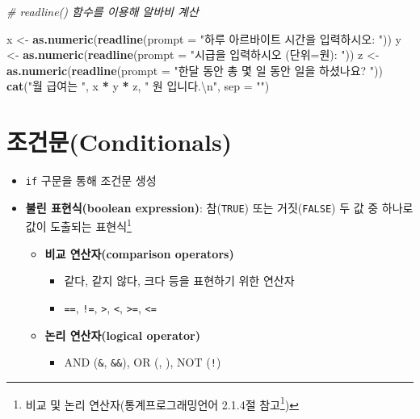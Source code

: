 \documentclass[
  11pt,
]{krantz}
\newenvironment{Shaded}{\begin{snugshade}}{\end{snugshade}}
\newcommand{\CharTok}[1]{\textcolor[rgb]{0.5,0.5,0.5}{#1}}
\newcommand{\CommentTok}[1]{\textcolor[rgb]{0.37,0.37,0.37}{\textit{#1}}}
\newcommand{\DataTypeTok}[1]{\textcolor[rgb]{0.27,0.27,0.27}{#1}}
\newcommand{\KeywordTok}[1]{\textcolor[rgb]{0.27,0.27,0.27}{\textbf{#1}}}
\newcommand{\NormalTok}[1]{#1}
\newcommand{\OperatorTok}[1]{\textcolor[rgb]{0.43,0.43,0.43}{\textbf{#1}}}
\newcommand{\StringTok}[1]{\textcolor[rgb]{0.5,0.5,0.5}{#1}}
\providecommand{\tightlist}{%
  \setlength{\itemsep}{0pt}\setlength{\parskip}{0pt}}
\renewcommand{\href}[2]{#2\footnote{\url{#1}}}
\begin{document}
\normalsize

\footnotesize

\begin{Shaded}
\begin{Highlighting}[]
\CommentTok{# readline() 함수를 이용해 알바비 계산}

\NormalTok{x <-}\StringTok{ }\KeywordTok{as.numeric}\NormalTok{(}\KeywordTok{readline}\NormalTok{(}\DataTypeTok{prompt =} \StringTok{"하루 아르바이트 시간을 입력하시오: "}\NormalTok{))}
\NormalTok{y <-}\StringTok{ }\KeywordTok{as.numeric}\NormalTok{(}\KeywordTok{readline}\NormalTok{(}\DataTypeTok{prompt =} \StringTok{"시급을 입력하시오 (단위=원): "}\NormalTok{))}
\NormalTok{z <-}\StringTok{ }\KeywordTok{as.numeric}\NormalTok{(}\KeywordTok{readline}\NormalTok{(}\DataTypeTok{prompt =} \StringTok{"한달 동안 총 몇 일 동안 일을 하셨나요? "}\NormalTok{))}
\KeywordTok{cat}\NormalTok{(}\StringTok{"월 급여는 "}\NormalTok{, x }\OperatorTok{*}\StringTok{ }\NormalTok{y }\OperatorTok{*}\StringTok{ }\NormalTok{z, }\StringTok{" 원 입니다.}\CharTok{\textbackslash{}n}\StringTok{"}\NormalTok{, }\DataTypeTok{sep =} \StringTok{""}\NormalTok{)}
\end{Highlighting}
\end{Shaded}

\normalsize

\hypertarget{condition}{%
\section{조건문(Conditionals)}\label{condition}}

\begin{itemize}
\tightlist
\item
  \texttt{if} 구문을 통해 조건문 생성
\item
  \textbf{불린 표현식(boolean expression)}: 참(\texttt{TRUE}) 또는 거짓(\texttt{FALSE}) 두 값 중 하나로 값이 도출되는 표현식\footnote{비교 및 논리 연산자(\href{https://zorba78.github.io/cnu-r-programming-lecture-note/scalar.html\#character}{통계프로그래밍언어 2.1.4절 참고})}

  \begin{itemize}
  \tightlist
  \item
    \textbf{비교 연산자(comparison operators)}

    \begin{itemize}
    \tightlist
    \item
      같다, 같지 않다, 크다 등을 표현하기 위한 연산자
    \item
      \texttt{==}, \texttt{!=}, \texttt{\textgreater{}}, \texttt{\textless{}}, \texttt{\textgreater{}=}, \texttt{\textless{}=}
    \end{itemize}
  \item
    \textbf{논리 연산자(logical operator)}

    \begin{itemize}
    \tightlist
    \item
      AND (\texttt{\&}, \texttt{\&\&}), OR (\texttt{\textbar{}}, \texttt{\textbar{}\textbar{}}), NOT (\texttt{!})
    \end{itemize}
  \end{itemize}
\end{itemize}
\end{document}
